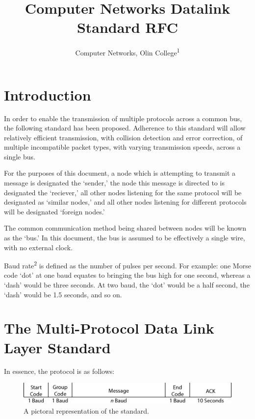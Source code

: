 \documentclass[11pt]{article}
\title{Computer Networks Datalink Standard RFC}
\author{Computer Networks, Olin College\textsuperscript{1}}
\begin{document}

\maketitle

\section{Introduction}

In order to enable the transmission of multiple protocols across a common bus, the following standard has been proposed. Adherence to this standard will allow relatively efficient transmission, with collision detection and error correction, of multiple incompatible packet types, with varying transmission speeds, across a single bus.

For the purposes of this document, a node which is attempting to transmit a message is designated the `sender,' the node this message is directed to is designated the `reciever,' all other nodes listening for the same protocol will be designated as `similar nodes,' and all other nodes listening for different protocols will be designated `foreign nodes.'

The common communication method being shared between nodes will be known as the `bus.' In this document, the bus is assumed to be effectively a single wire, with no external clock.

Baud rate\textsuperscript{2} is defined as the number of pulses per second. For example: one Morse code `dot' at one baud equates to bringing the bus high for one second, whereas a `dash' would be three seconds. At two baud, the `dot' would be a half second, the `dash' would be 1.5 seconds, and so on.


\section{The Multi-Protocol Data Link Layer Standard}

In essence, the protocol is as follows:

\begin{figure}[!ht]
\centering
\includegraphics[width=\textwidth]{datalink_diagram.png}
\caption{A pictoral representation of the standard.}
\label{fig:standard}
\end{figure}
\end{document}
